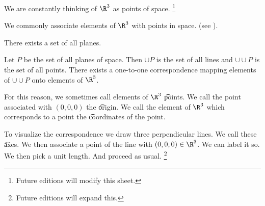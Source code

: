 

We are constantly thinking of $\R ^3$ as points of space.
  \ifhmode\unskip\fi\footnote{
Future editions will modify this sheet.
  }


We commonly associate elements of $\R ^3$ with points in space. (see ).

\begin{principle}
There exists a set of all planes.
\end{principle}

\begin{principle}
Let $P$ be the set of all planes of space.
Then $\cup P$ is the set of all lines and $\cup \cup P$ is the set of all points.
There exists a one-to-one correspondence mapping elements of $\cup \cup P$ onto elements of $\R ^3$.
\end{principle}
For this reason, we sometimes call elements of $\R ^3$ \t{points}.
We call the point associated with $(0, 0, 0)$ the \t{origin}.
We call the element of $\R ^3$ which corresponds to a point the \t{coordinates} of the point.


To visualize the correspondence we draw three perpendicular lines.
We call these \t{axes}.
We then associate a point of the line with $(0, 0, 0) \in \R ^3$.
We can label it so.
We then pick a unit length.
And proceed as usual.
  \ifhmode\unskip\fi\footnote{
Future editions will expand this.
  }

\blankpage
